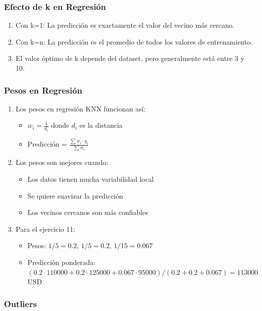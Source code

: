 \documentclass[12pt]{article}
\begin{document}
\subsubsection{Efecto de k en Regresión}

\begin{enumerate}
    \item Con k=1: La predicción es exactamente el valor del vecino más cercano.
    \item Con k=n: La predicción es el promedio de todos los valores de entrenamiento.
    \item El valor óptimo de k depende del dataset, pero generalmente está entre 3 y 10.
\end{enumerate}

\subsubsection{Pesos en Regresión}

\begin{enumerate}
    \item Los pesos en regresión KNN funcionan así:
    \begin{itemize}
        \item $w_i = \frac{1}{d_i}$ donde $d_i$ es la distancia
        \item Predicción = $\frac{\sum w_i \cdot y_i}{\sum w_i}$
    \end{itemize}
    \item Los pesos son mejores cuando:
    \begin{itemize}
        \item Los datos tienen mucha variabilidad local
        \item Se quiere suavizar la predicción
        \item Los vecinos cercanos son más confiables
    \end{itemize}
    \item Para el ejercicio 11:
    \begin{itemize}
        \item Pesos: $1/5 = 0.2$, $1/5 = 0.2$, $1/15 = 0.067$
        \item Predicción ponderada: $(0.2 \cdot 110000 + 0.2 \cdot 125000 + 0.067 \cdot 95000) / (0.2 + 0.2 + 0.067) = 113000$ USD
    \end{itemize}
\end{enumerate}

\subsubsection{Outliers}
\end{document}
